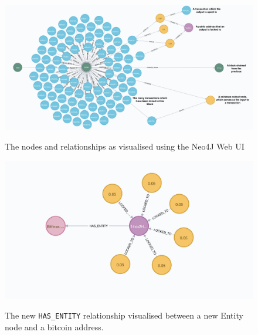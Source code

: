 \begin{figure}[h!]
  \centering
  \includegraphics[width = 15cm]{./figures/neo4j-annotated}\\[0.5cm] 
  \caption{The nodes and relationships as visualised using the Neo4J Web UI}
  \label{fig:neo4j-layout}
\end{figure}

\begin{figure}[h!]
  \centering
  \includegraphics[width = 15cm]{./figures/has-entity-relationship}\\[0.5cm] 
  \caption{The new \texttt{HAS\_ENTITY} relationship visualised between a new Entity node and a bitcoin address.}
  \label{fig:neo4j-has-entity}
\end{figure}

